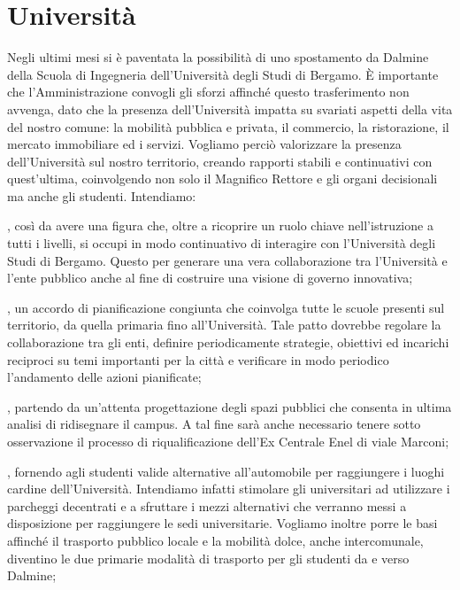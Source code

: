 \section{Università}
Negli ultimi mesi si è paventata la possibilità di uno spostamento da Dalmine della Scuola di Ingegneria dell'Università degli Studi di Bergamo. È importante che l'Amministrazione convogli gli sforzi affinché questo trasferimento non avvenga, dato che la presenza dell'Università impatta su svariati aspetti della vita del nostro comune: la mobilità pubblica e privata, il commercio, la ristorazione, il mercato immobiliare ed i servizi. Vogliamo perciò valorizzare la presenza dell'Università sul nostro territorio, creando rapporti stabili e continuativi con quest'ultima, coinvolgendo non solo il Magnifico Rettore e gli organi decisionali ma anche gli studenti. Intendiamo:

, così da avere una figura che, oltre a ricoprire un ruolo chiave nell'istruzione a tutti i livelli, si occupi in modo continuativo di interagire con l'Università degli Studi di Bergamo. Questo per generare una vera collaborazione tra l'Università e l'ente pubblico anche al fine di costruire una visione di governo innovativa;

, un accordo di pianificazione congiunta che coinvolga tutte le scuole presenti sul territorio, da quella primaria fino all'Università. Tale patto dovrebbe regolare la collaborazione tra gli enti, definire periodicamente strategie, obiettivi ed incarichi reciproci su temi importanti per la città e verificare in modo periodico l'andamento delle azioni pianificate;

, partendo da un'attenta progettazione degli spazi pubblici che consenta in ultima analisi di ridisegnare il campus. A tal fine sarà anche necessario tenere sotto osservazione il processo di riqualificazione dell'Ex Centrale Enel di viale Marconi;

, fornendo agli studenti valide alternative all'automobile per raggiungere i luoghi cardine dell'Università. Intendiamo infatti stimolare gli universitari ad utilizzare i parcheggi decentrati e a sfruttare i mezzi alternativi che verranno messi a disposizione per raggiungere le sedi universitarie. Vogliamo inoltre porre le basi affinché il trasporto pubblico locale e la mobilità dolce, anche intercomunale, diventino le due primarie modalità di trasporto per gli studenti da e verso Dalmine;

